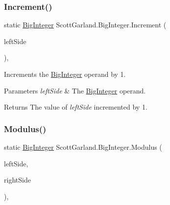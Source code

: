 \subsubsection{\texorpdfstring{Increment()}{Increment()}}
{\footnotesize\ttfamily static \hyperlink{class_scott_garland_1_1_big_integer}{Big\+Integer} Scott\+Garland.\+Big\+Integer.\+Increment (\begin{DoxyParamCaption}\item[{\hyperlink{class_scott_garland_1_1_big_integer}{Big\+Integer}}]{left\+Side }\end{DoxyParamCaption})\hspace{0.3cm}{\ttfamily [inline]}, {\ttfamily [static]}}



Increments the \hyperlink{class_scott_garland_1_1_big_integer}{Big\+Integer} operand by 1. 


\begin{DoxyParams}{Parameters}
{\em left\+Side} & The \hyperlink{class_scott_garland_1_1_big_integer}{Big\+Integer} operand.\\
\hline
\end{DoxyParams}
\begin{DoxyReturn}{Returns}
The value of {\itshape left\+Side}  incremented by 1.
\end{DoxyReturn}
\mbox{\label{class_scott_garland_1_1_big_integer_a99ca834445147bc4de1d108376a790c3}} 
\subsubsection{\texorpdfstring{Modulus()}{Modulus()}}
{\footnotesize\ttfamily static \hyperlink{class_scott_garland_1_1_big_integer}{Big\+Integer} Scott\+Garland.\+Big\+Integer.\+Modulus (\begin{DoxyParamCaption}\item[{\hyperlink{class_scott_garland_1_1_big_integer}{Big\+Integer}}]{left\+Side,  }\item[{\hyperlink{class_scott_garland_1_1_big_integer}{Big\+Integer}}]{right\+Side }\end{DoxyParamCaption})\hspace{0.3cm}{\ttfamily [inline]}, {\ttfamily [static]}}



